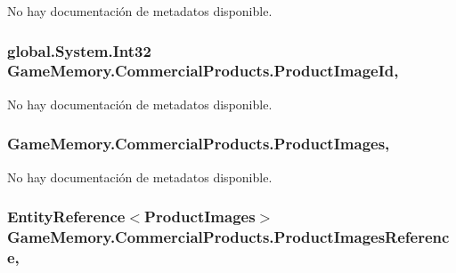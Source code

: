 No hay documentación de metadatos disponible. 

\hypertarget{class_game_memory_1_1_commercial_products_ab31ea73b3ff3ec456f255b1e215d9147}{
\subsubsection[{Product\-Image\-Id}]{\setlength{\rightskip}{0pt plus 5cm}global.\-System.\-Int32 Game\-Memory.\-Commercial\-Products.\-Product\-Image\-Id\hspace{0.3cm}{\ttfamily [get]}, {\ttfamily [set]}}}\label{class_game_memory_1_1_commercial_products_ab31ea73b3ff3ec456f255b1e215d9147}


No hay documentación de metadatos disponible. 

\hypertarget{class_game_memory_1_1_commercial_products_ab629e8b21894196949bdae2f5737dd8b}{
\subsubsection[{Product\-Images}]{ Game\-Memory.\-Commercial\-Products.\-Product\-Images\hspace{0.3cm}{\ttfamily [get]}, {\ttfamily [set]}}}\label{class_game_memory_1_1_commercial_products_ab629e8b21894196949bdae2f5737dd8b}


No hay documentación de metadatos disponible. 

\hypertarget{class_game_memory_1_1_commercial_products_a2edf86daa617b84658102b4aef34c4b0}{
\subsubsection[{Product\-Images\-Reference}]{\setlength{\rightskip}{0pt plus 5cm}Entity\-Reference$<${\bf Product\-Images}$>$ Game\-Memory.\-Commercial\-Products.\-Product\-Images\-Reference\hspace{0.3cm}{\ttfamily [get]}, {\ttfamily [set]}}}\label{class_game_memory_1_1_commercial_products_a2edf86daa617b84658102b4aef34c4b0}


